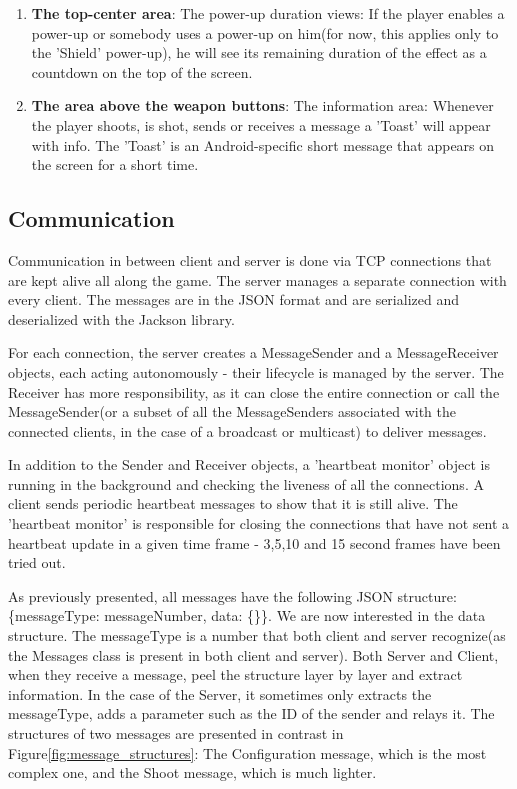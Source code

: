 \begin{enumerate}
  \item \textbf{The top-center area}: The power-up duration views: If the player
  enables a power-up or somebody uses a power-up on him(for now, this applies
  only to the 'Shield' power-up), he will see its remaining duration of the
  effect as a countdown on the top of the screen.
  
  \item \textbf{The area above the weapon buttons}: The information area:
  Whenever the player shoots, is shot, sends or receives a message a 'Toast'
  will appear with info. The 'Toast' is an Android-specific short message that
  appears on the screen for a short time.
  
\end{enumerate}


\subsection{Communication}

Communication in between client and server is done via TCP connections that are
kept alive all along the game. The server manages a separate connection with
every client. The messages are in the JSON format and are serialized and
deserialized with the Jackson library.\newline

For each connection, the server creates a MessageSender and a MessageReceiver
objects, each acting autonomously - their lifecycle is managed by the server.
The Receiver has more responsibility, as it can close the entire connection
or call the MessageSender(or a subset of all the MessageSenders associated with
the connected clients, in the case of a broadcast or multicast) to deliver
messages.\newline

In addition to the Sender and Receiver objects, a 'heartbeat monitor' object is
running in the background and checking the liveness of all the connections. A
client sends periodic heartbeat messages to show that it is still alive. The
'heartbeat monitor' is responsible for closing the connections that have not
sent a heartbeat update in a given time frame - 3,5,10 and 15 second frames have
been tried out.\newline

As previously presented, all messages have the following JSON structure:
\{messageType: messageNumber, data: \{\}\}. We are now interested in the data
structure. The messageType is a number that both client and server recognize(as
the Messages class is present in both client and server). Both Server
and Client, when they receive a message, peel the structure layer by
layer and extract information. In the case of the Server, it sometimes
only extracts the messageType, adds a parameter such as the ID of the
sender and relays it. The structures of two messages are presented in
contrast in Figure\ref{fig:message_structures}: The Configuration message,
which is the most complex one, and the Shoot message, which is much lighter.\newline

